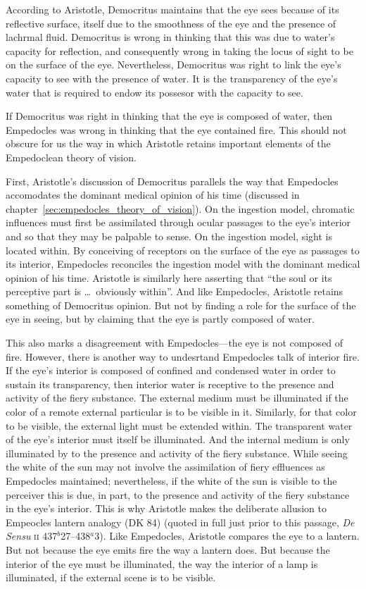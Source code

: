 According to Aristotle, Democritus maintains that the eye sees because of its reflective surface, itself due to the smoothness of the eye and the presence of lachrmal fluid. Democritus is wrong in thinking that this was due to water's capacity for reflection, and consequently wrong in taking the locus of sight to be on the surface of the eye. Nevertheless, Democritus was right to link the eye's capacity to see with the presence of water. It is the transparency of the eye's water that is required to endow its possesor with the capacity to see. 

If Democritus was right in thinking that the eye is composed of water, then Empedocles was wrong in thinking that the eye contained fire. This should not obscure for us the way in which Aristotle retains important elements of the Empedoclean theory of vision.

First, Aristotle's discussion of Democritus parallels the way that Empedocles accomodates the dominant medical opinion of his time (discussed in chapter~\ref{sec:empedocles_theory_of_vision}). On the ingestion model, chromatic influences must first be assimilated through ocular passages to the eye's interior and so that they may be palpable to sense. On the ingestion model, sight is located within. By conceiving of receptors on the surface of the eye as passages to its interior, Empedocles reconciles the ingestion model with the dominant medical opinion of his time. Aristotle is similarly here asserting that ``the soul or its perceptive part is \ldots\ obviously within''. And like Empedocles, Aristotle retains something of Democritus opinion. But not by finding a role for the surface of the eye in seeing, but by claiming that the eye is partly composed of water. 

This also marks a disagreement with Empedocles---the eye is not composed of fire. However, there is another way to undesrtand Empedocles talk of interior fire. If the eye's interior is composed of confined and condensed water in order to sustain its transparency, then interior water is receptive to the presence and activity of the fiery substance. The external medium must be illuminated if the color of a remote external particular is to be visible in it. Similarly, for that color to be visible, the external light must be extended within. The transparent water of the eye's interior must itself be illuminated. And the internal medium is only illuminated by to the presence and activity of the fiery substance. While seeing the white of the sun may not involve the assimilation of fiery effluences as Empedocles maintained; nevertheless, if the white of the sun is visible to the perceiver this is due, in part, to the presence and activity of the fiery substance in the eye's interior. This is why Aristotle makes the deliberate allusion to Empeocles lantern analogy (DK 84) (quoted in full just prior to this passage, \emph{De Sensu} \textsc{ii} 437\( ^{b} \)27--438\( ^{a} \)3). Like Empedocles, Aristotle compares the eye to a lantern. But not because the eye emits fire the way a lantern does. But because the interior of the eye must be illuminated, the way the interior of a lamp is illuminated, if the external scene is to be visible. 

